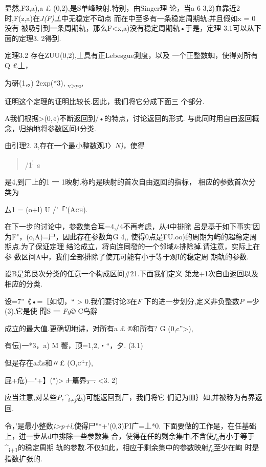 \documentclass{article}
\begin{document}
显然,F3,a),a £ (0,2),是S单峰映射.特别，由Singer理 论，当a 6
3,2)血靠近2时,F(z,a)在\emph{J(F)丄}中无稳定不动点
而在中至多有一条稳定周期轨;并且假如x = 0没有
被吸引到一条周期轨，那么F\textless{}x,a)没有稳定周期轨•于是，定理
3.1可以从下面的定理3. 2得到.

定理3.2 存在ZUU(0,2),丄具有正Lebesgue測度，以及
一个正整数蜘，使得对所有Q £丄，

\textbar{}为硏(1,。)\textbar{} 2exp(*3),
\textsubscript{v\textgreater{}yo},

证明这个定理的证明比较长.因此，我们将它分成下面三 个部分.

A我们根据\textgreater{}(0,«)不断返回到/•的特点，讨论返回的形式.
与此同时用自由返回概念，归纳地将参数区间4分类.

由引理2. 3,存在一个最小整数观J〉\emph{N)}，使得

\begin{quote}
/1\textsuperscript{!} \emph{a}
\end{quote}

是4,到厂上的1 一 1映射.称旳是映射的首次自由返回的指标，
相应的参数首次分类为

厶1 = (o+l) U /\textsc{'「'(Ach).}

在下一步的讨论中，参数集合耳=4,/4不再考虑，从4中排除
呂是基于如下事实'因为F"，(o,A)=尸，因此存在参数角G 4,,
使得0点是FU.oo)的周期为屿的超稳定周期点.为了保证定理
结论成立，将向连同發的一个邻域\&排除掉.请注意，实际上在参
数区间A中，我们全部排除了使兀可能有小于等于观I的稳定周 期轨的参数.

设B是第艮次分类的任意一个构成区间\#21.下面我们定义
第龙+1次自由返回以及相应的分类.

设=7''《•=［如切，\textbar{}``\textbar{} \textgreater{}
0.我们要讨论3在\emph{F} 下的进一步划分,定义非负整数\emph{P}
=少(3),它是使 聞S 一 \emph{Fg©} \textbar{} C鸟辭

成立的最大值.更确切地讲，对所有a £ ®和所有? G (0,c''\textgreater{}),

有伝)一*3，a)\textbar{} M 饗，顶=1,2,・``，夕. (3.1)

但是存在a£s和〃£ \textsc{(O,c``t),}

屁+危)---"+】(")\textbar{}\textgreater{} \sout{J 篇界，.} \textless{}3.
2)

应当注意,对某些\emph{P,\^{}\textsubscript{i+j}}怎)可能返回到厂，我们将它
们记为皿｝如,并被称为有界返回.

令，'是最小整数\emph{i\textgreater{}p+l,}使得尸"*+'(0,3)PI广=丄*0.
下面要做的工作是，在任基础上，迸一步从d中排除一些参数集
合，使得在任的剩余集中,不含使\emph{f\textsubscript{a}}有小于等于\^{}\textsubscript{i+1}的稳定周期
轨的参数.不仅如此，相应于剩余集中的参数映射\emph{f\textsubscript{a}}至少在峋
时是指数扩张的.
\end{document}
